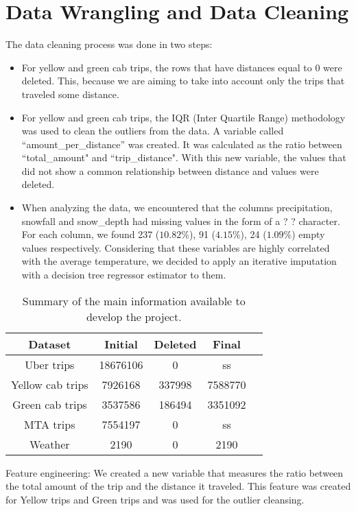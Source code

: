 \section{Data Wrangling and Data Cleaning}
\label{subsec:dataCl}

The data cleaning process was done in two steps:

\begin{itemize}
\item For yellow and green cab trips, the rows that have distances equal to $0$ were deleted. This, because we are aiming to take into account only the trips that traveled some distance.
\item For yellow and green cab trips, the IQR (Inter Quartile Range) methodology was used to clean the outliers from the data. A variable called ``amount\_per\_distance'' was created. It was calculated as the ratio between ``total\_amount" and ``trip\_distance". With this new variable, the values that did not show a common relationship between distance and values were deleted.
\item When analyzing the data, we encountered that the columns precipitation, snowfall and snow\_depth had missing values in the form of a ? ? character. For each column, we found 237 ($10.82\%$), 91 ($4.15\%$), 24 ($1.09\%$) empty values respectively. Considering that these variables are highly correlated with the average temperature, we decided to apply an iterative imputation with a decision tree regressor estimator to them.
\end{itemize}

\begin{table}[h]
\begin{center}
\label{tab:dataset}
\begin{tabular}{|c|c|c|c|c|}
\hline
\textbf{Dataset} & \textbf{Initial} & \textbf{Deleted} & \textbf{Final}  \\
\hline
 Uber trips &  18676106	& 0  & ss\\
Yellow cab trips & 7926168 & 337998 & 7588770\\
Green cab trips &  3537586 & 186494 & 3351092\\
MTA trips & 7554197	&  0	& ss\\
Weather & 	2190 &  0 & 2190\\
\hline
\end{tabular}
 \caption{Summary of the main information available to develop the project.}
\end{center}
\end{table}


Feature engineering:
We created a new variable that measures the ratio between the total amount of the trip and the distance it traveled. This feature was created for Yellow trips and Green trips and was used for the outlier cleansing.

